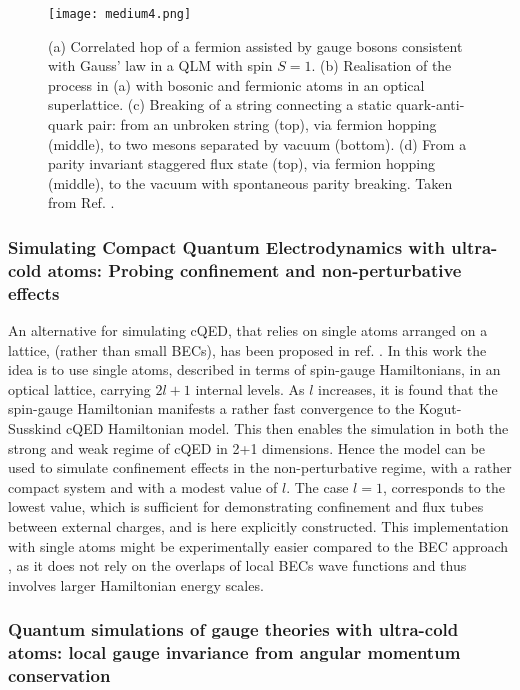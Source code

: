 \documentclass[epj,final]{svjour}
\begin{document}
\begin{figure}
\begin{center}
\texttt{[image: medium4.png]}
\end{center}
\caption{(a) Correlated hop of a fermion assisted by gauge bosons consistent with Gauss' law in a QLM with spin $S=1$.  (b) Realisation of the process in (a) with bosonic and fermionic atoms in an optical superlattice. (c) Breaking of a string connecting a static quark-anti-quark pair: from an unbroken string (top), via fermion hopping (middle), to two mesons separated by vacuum (bottom). (d) From a parity invariant staggered flux state (top), via fermion hopping (middle), to the vacuum with spontaneous parity breaking. Taken from Ref. \cite{banerjee2012atomic}.}
\end{figure}

\subsubsection{Simulating Compact Quantum Electrodynamics with ultra-cold atoms: Probing confinement and non-perturbative effects\cite{zohar2012simulating}}

An alternative for simulating cQED, that relies on single atoms arranged on a lattice, (rather than small BECs), has been proposed in ref. \cite{zohar2012simulating}. In this work the idea is to use single atoms, described in terms of spin-gauge Hamiltonians, in an optical lattice, carrying $2l+1$ internal levels. As $l$ increases, it is found that the spin-gauge Hamiltonian manifests a rather fast convergence to the Kogut-Susskind cQED Hamiltonian model. This then enables the simulation in both the strong and weak regime of cQED in 2+1 dimensions. Hence the model can be used to simulate confinement effects in the non-perturbative regime, with a rather compact system and with a modest value of $l$. The case $l = 1$, corresponds to the lowest value, which is sufficient for demonstrating confinement and flux tubes between external charges, and is here explicitly constructed. This implementation with single atoms might be experimentally easier compared to the BEC approach \cite{zohar2011confinement}, as it does not rely on the overlaps of local BECs wave functions and thus involves larger Hamiltonian energy scales. 

\subsubsection{Quantum simulations of gauge theories with ultra-cold atoms: local gauge invariance from angular momentum conservation\cite{zohar2013quantum}}
\end{document}
